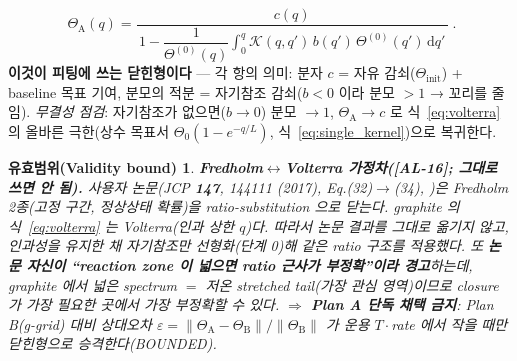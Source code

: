 \documentclass[11pt,a4paper]{article}
\newtheorem*{boundbox}{유효범위(Validity bound)}
\newcommand{\dd}{\mathrm{d}}
\newcommand{\AL}[1]{\textsf{[AL-#1]}}
\begin{document}
\begin{equation}
\boxed{\;\Theta_\mathrm A(q)=\frac{c(q)}{\,1-\dfrac{1}{\Theta^{(0)}(q)}\displaystyle\int_0^q\mathcal K(q,q')\,b(q')\,\Theta^{(0)}(q')\,\dd q'\,}\;.}
\label{eq:closed}
\end{equation}
\textbf{이것이 피팅에 쓰는 닫힌형이다} — 각 항의 의미: 분자 $c$ = 자유 감쇠($\Theta_\mathrm{init}$) + baseline
목표 기여, 분모의 적분 = 자기참조 감쇠($b<0$ 이라 분모 $>1$ → 꼬리를 줄임). \emph{무결성 점검}: 자기참조가
없으면($b\to0$) 분모 $\to1$, $\Theta_\mathrm A\to c$ 로 식~\eqref{eq:volterra} 의 올바른 극한(상수 목표서
$\Theta_0(1-e^{-q/L})$, 식~\eqref{eq:single_kernel})으로 복귀한다.
\begin{boundbox}
\textbf{Fredholm$\leftrightarrow$Volterra 가정차(\AL{16}; 그대로 쓰면 안 됨).} 사용자 논문(\emph{JCP}
\textbf{147}, 144111 (2017), Eq.(32)$\to$(34), \cite{jcp2017})은 \emph{Fredholm} 2종(고정 구간, 정상상태 확률)을
ratio-substitution 으로 닫는다. graphite 의 식~\eqref{eq:volterra} 는 \emph{Volterra}(인과 상한 $q$)다. 따라서
논문 결과를 그대로 옮기지 않고, 인과성을 유지한 채 자기참조만 선형화(단계 0)해 \emph{같은} ratio 구조를 적용했다.
또 \textbf{논문 자신이 ``reaction zone 이 넓으면 ratio 근사가 부정확''이라 경고}하는데, graphite 에서 넓은
spectrum $=$ 저온 stretched tail(가장 관심 영역)이므로 closure 가 가장 필요한 곳에서 가장 부정확할 수 있다.
$\Rightarrow$ \textbf{Plan A 단독 채택 금지}: Plan B(g-grid) 대비 상대오차
$\varepsilon=\lVert\Theta_\mathrm A-\Theta_\mathrm B\rVert/\lVert\Theta_\mathrm B\rVert$ 가 운용 $T\cdot$rate 에서
작을 때만 닫힌형으로 승격한다(BOUNDED).
\end{boundbox}

\end{document}
